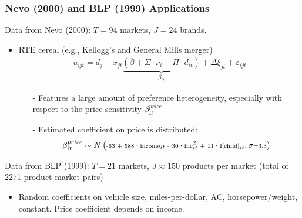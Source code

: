 \documentclass[xcolor=pdftex,dvipsnames,table,mathserif,aspectratio=169]{beamer}
\begin{document}
\begin{frame}
\footnotesize
\frametitle{Nevo (2000) and BLP (1999) Applications}
Data from Nevo (2000): $T=94$ markets, $J=24$ brands.
\begin{itemize}
\item RTE cereal (e.g., Kellogg's and General Mills merger)
\begin{eqnarray*}
u_{ijt} = d_{j} + x_{jt} \underbrace{(\overline{\beta} + \Sigma\cdot \nu_i + \Pi\cdot d_{it})}_{\beta_{it}} + \Delta \xi_{jt} + \varepsilon_{ijt}
\end{eqnarray*}

\begin{itemize}
\item[-] Features a large amount of preference heterogeneity, especially with respect to the price sensitivity $\beta_{it}^{price}$
\item[-] Estimated coefficient on price is distributed:
\begin{eqnarray*}
\scriptsize
\beta_{it}^{price} \sim N\left(\text{-63 + 588} \cdot \text{income}_{it} \text{ - 30} \cdot \text{inc}^2_{it}  \text{ + 11}\cdot \text{I[child]}_{it}, \sigma \text{=3.3}\right)
\end{eqnarray*}
\end{itemize}
\end{itemize}

Data from BLP (1999): $T=21$ markets, $J \approx 150$ products per market (total of 2271 product-market pairs)
\begin{itemize}
\item Random coefficients on vehicle size, miles-per-dollar, AC, horsepower/weight, constant. Price coefficient depends on income.
\end{itemize}
\end{frame}

\end{document}
